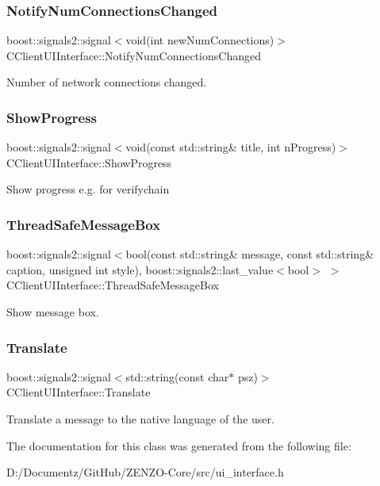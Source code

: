\subsubsection{\texorpdfstring{NotifyNumConnectionsChanged}{NotifyNumConnectionsChanged}}
{\footnotesize\ttfamily boost\+::signals2\+::signal$<$void(int new\+Num\+Connections)$>$ C\+Client\+U\+I\+Interface\+::\+Notify\+Num\+Connections\+Changed}

Number of network connections changed. \mbox{\label{class_c_client_u_i_interface_a2190089fbdfd78221c4b74ca98e96e01}} 
\subsubsection{\texorpdfstring{ShowProgress}{ShowProgress}}
{\footnotesize\ttfamily boost\+::signals2\+::signal$<$void(const std\+::string\& title, int n\+Progress)$>$ C\+Client\+U\+I\+Interface\+::\+Show\+Progress}

Show progress e.\+g. for verifychain \mbox{\label{class_c_client_u_i_interface_a93e77ea8828d8d960348cf4648b7f374}} 
\subsubsection{\texorpdfstring{ThreadSafeMessageBox}{ThreadSafeMessageBox}}
{\footnotesize\ttfamily boost\+::signals2\+::signal$<$bool(const std\+::string\& message, const std\+::string\& caption, unsigned int style), boost\+::signals2\+::last\+\_\+value$<$bool$>$ $>$ C\+Client\+U\+I\+Interface\+::\+Thread\+Safe\+Message\+Box}

Show message box. \mbox{\label{class_c_client_u_i_interface_a6e1e57cb42e3a1a0b133745a897cf8ed}} 
\subsubsection{\texorpdfstring{Translate}{Translate}}
{\footnotesize\ttfamily boost\+::signals2\+::signal$<$std\+::string(const char$\ast$ psz)$>$ C\+Client\+U\+I\+Interface\+::\+Translate}

Translate a message to the native language of the user. 

The documentation for this class was generated from the following file\+:\begin{DoxyCompactItemize}
\item 
D\+:/\+Documentz/\+Git\+Hub/\+Z\+E\+N\+Z\+O-\/\+Core/src/ui\+\_\+interface.\+h\end{DoxyCompactItemize}
